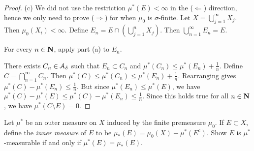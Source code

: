\documentclass[10pt,twoside,openany]{memoir}
\begin{document}
\begin{proof}
        (c) We did not use the restriction $\mu^\ast (E) < \infty$ in the ($\Leftarrow$) direction, hence we only need to prove ($\Rightarrow$) for when $\mu_0$ is $\sigma$-finite. Let $X = \bigcup_{j = 1}^\infty X_j$. Then $\mu_0(X_i) < \infty$. Define $E_n = E \cap \left( \bigcup_{j = 1}^n X_j \right)$. Then $\bigcup_{n = 1}^\infty E_n = E$. \nl
        
        \noindent For every $n \in \mathbf{N}$, apply part (a) to $E_n$. \nl
        
        \noindent There exists $C_n \in \mathcal{A}_\delta$ such that $E_n \subset C_n$ and $\mu^\ast(C_n) \leq \mu^\ast(E_n) + \frac{1}{n}$. Define $C = \bigcap_{n = 1}^\infty C_n$. Then $\mu^\ast(C) \leq \mu^\ast(C_n) \leq \mu^\ast(E_n) + \frac{1}{n}$. Rearranging gives $\mu^\ast(C) - \mu^\ast(E_n) \leq \frac{1}{n}$. But since $\mu^\ast(E_n) \leq \mu^\ast(E)$, we have $\mu^\ast(C) - \mu^\ast(E) \leq \mu^\ast(C) - \mu^\ast(E_n) \leq \frac{1}{n}$. Since this holds true for all $n \in \mathbf{N}$, we have $\mu^\ast(C \setminus E) = 0$.
    \end{proof}
\begin{exercise}
    Let $\mu^\ast$ be an outer measure on $X$ induced by the finite premeasure $\mu_0$. If $E \subset X$, define the \textit{inner measure} of $E$ to be $\mu_\ast(E) = \mu_0(X) - \mu^\ast(E^c)$. Show $E$ is $\mu^\ast$-measurable if and only if $\mu^\ast(E) = \mu_\ast(E)$.
\end{exercise}
\end{document}
